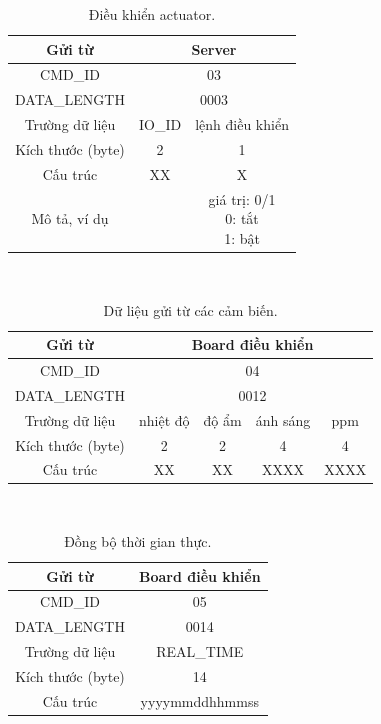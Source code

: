 \documentclass[a4paper,12pt,oneside]{article}
\begin{document}
\begin{table}[H]
\centering
\begin{tabular}{|c|c|c|}
\hline 
Gửi từ & \multicolumn{2}{c|}{Server} \\ 
\hline 
CMD\_ID & \multicolumn{2}{c|}{03} \\ 
\hline 
DATA\_LENGTH & \multicolumn{2}{c|}{0003} \\ 
\hline 
Trường dữ liệu & IO\_ID & lệnh điều khiển \\ 
\hline 
Kích thước (byte) & 2 & 1 \\ 
\hline 
Cấu trúc & XX & X \\ 
\hline 
Mô tả, ví dụ &  & \makecell{giá trị: 0/1 \\ 0: tắt \\ 1: bật} \\ 
\hline 
\end{tabular} 
\caption{Điều khiển actuator.}
\end{table}
\noindent \\
\begin{table}[H]
\centering
\begin{tabular}{|c|c|c|c|c|}
\hline 
Gửi từ & \multicolumn{4}{c|}{Board điều khiển} \\ 
\hline 
CMD\_ID & \multicolumn{4}{c|}{04} \\ 
\hline 
DATA\_LENGTH & \multicolumn{4}{c|}{0012} \\ 
\hline 
Trường dữ liệu & nhiệt độ & độ ẩm & ánh sáng & ppm \\ 
\hline 
Kích thước (byte) & 2 & 2 & 4 & 4 \\ 
\hline 
Cấu trúc & XX & XX & XXXX & XXXX \\ 
\hline 
\end{tabular} 
\caption{Dữ liệu gửi từ các cảm biến.}
\end{table}
\noindent \\
\begin{table}[H]
\centering
\begin{tabular}{|c|c|}
\hline 
Gửi từ & Board điều khiển \\ 
\hline 
CMD\_ID & 05 \\ 
\hline 
DATA\_LENGTH & 0014 \\ 
\hline 
Trường dữ liệu & REAL\_TIME \\ 
\hline 
Kích thước (byte) & 14 \\ 
\hline 
Cấu trúc & yyyymmddhhmmss \\ 
\hline 
\end{tabular} 
\caption{Đồng bộ thời gian thực.}
\end{table}
\end{document}
